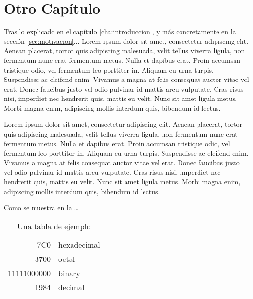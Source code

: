 



\chapter{Otro Capítulo}
\label{cha:otro_capitulo}

\ifpdf
    \graphicspath{{2_another_chapter/figures/PNG/}{2_another_chapter/figures/PDF/}{2_another_chapter/figures/}}
\else
    \graphicspath{{2_another_chapter/figures/EPS/}{2_another_chapter/figures/}}
\fi



Tras lo explicado en el capítulo \ref{cha:introduccion}, y más concretamente en la sección \ref{sec:motivacion}... Lorem ipsum dolor sit amet, consectetur adipiscing elit. Aenean placerat, tortor
quis adipiscing malesuada, velit tellus viverra ligula, non fermentum nunc erat
fermentum metus. Nulla et dapibus erat. Proin accumsan tristique odio, vel
fermentum leo porttitor in. Aliquam eu urna turpis. Suspendisse ac eleifend
enim. Vivamus a magna at felis consequat auctor vitae vel erat. Donec faucibus
justo vel odio pulvinar id mattis arcu vulputate. Cras risus nisi, imperdiet nec
hendrerit quis, mattis eu velit. Nunc sit amet ligula metus. Morbi magna enim,
adipiscing mollis interdum quis, bibendum id lectus. 

Lorem ipsum dolor sit amet, consectetur adipiscing elit. Aenean placerat, tortor
quis adipiscing malesuada, velit tellus viverra ligula, non fermentum nunc erat
fermentum metus. Nulla et dapibus erat. Proin accumsan tristique odio, vel
fermentum leo porttitor in. Aliquam eu urna turpis. Suspendisse ac eleifend
enim. Vivamus a magna at felis consequat auctor vitae vel erat. Donec faucibus
justo vel odio pulvinar id mattis arcu vulputate. Cras risus nisi, imperdiet nec
hendrerit quis, mattis eu velit. Nunc sit amet ligula metus. Morbi magna enim,
adipiscing mollis interdum quis, bibendum id lectus. 

Como se muestra en la  \ldots

\begin{table}
\center
\caption{Una tabla de ejemplo}
\begin{tabular}{|r|l|}
  \hline
  7C0 & hexadecimal \\
  3700 & octal \\ \cline{2-2}
  11111000000 & binary \\
  \hline \hline
  1984 & decimal \\
  \hline
\end{tabular}
\label{tab:example}
\end{table}

